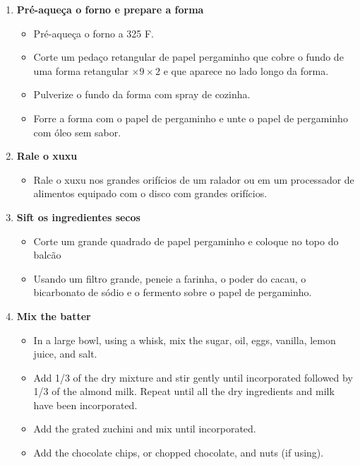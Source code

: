 \documentclass [11pt, letterpaper] {article}
\begin{document}
\begin {description}
\begin {enumerate}
\item {\bf Pré-aqueça o forno e prepare a forma}
\begin {itemize}
\item Pré-aqueça o forno a 325 F.
\item Corte um pedaço retangular de papel pergaminho que cobre o fundo de uma forma retangular $ \times 9 \times 2 $ e que aparece no lado longo da forma.
\item Pulverize o fundo da forma com spray de cozinha.
\item Forre a forma com o papel de pergaminho e unte o papel de
  pergaminho com \'oleo sem sabor.
\end {itemize}
\item {\bf Rale o xuxu}
\begin {itemize}
\item Rale o xuxu nos grandes orifícios de um ralador ou em um processador de alimentos equipado com o disco com grandes orifícios.
\end {itemize}
\item {\bf Sift os ingredientes secos}
\begin {itemize}
\item Corte um grande quadrado de papel pergaminho e coloque no topo do balcão
\item Usando um filtro grande, peneie a farinha, o poder do cacau, o bicarbonato de sódio e o fermento sobre o papel de pergaminho.
\end {itemize}
	\item {\bf Mix the batter}
	\begin{itemize}
	\item In a large bowl, using a whisk, mix the sugar, oil, eggs, vanilla, lemon juice, and salt.
	\item Add 1/3 of the dry mixture and stir gently until incorporated followed by 1/3 of the almond milk. Repeat until all the dry ingredients and milk have been incorporated.
	\item Add the grated zuchini and mix until incorporated.
	\item Add the chocolate chips, or chopped chocolate, and nuts (if using).
	\end{itemize}


\end{enumerate}
\end{description}
\end{document}
